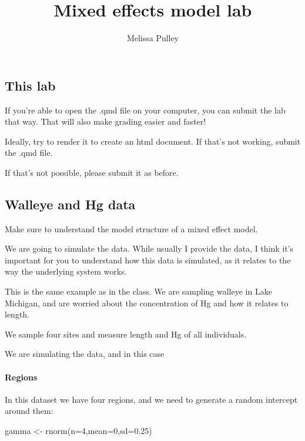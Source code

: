 \documentclass[
  letterpaper,
  DIV=11,
  numbers=noendperiod]{scrartcl}
\title{Mixed effects model lab}
\author{Melissa Pulley}
\date{}
\let\oldparagraph\paragraph
\renewcommand{\paragraph}[1]{\oldparagraph{#1}\mbox{}}
\newenvironment{Shaded}{\begin{snugshade}}{\end{snugshade}}
\newcommand{\AttributeTok}[1]{\textcolor[rgb]{0.40,0.45,0.13}{#1}}
\newcommand{\DecValTok}[1]{\textcolor[rgb]{0.68,0.00,0.00}{#1}}
\newcommand{\FloatTok}[1]{\textcolor[rgb]{0.68,0.00,0.00}{#1}}
\newcommand{\FunctionTok}[1]{\textcolor[rgb]{0.28,0.35,0.67}{#1}}
\newcommand{\NormalTok}[1]{\textcolor[rgb]{0.00,0.23,0.31}{#1}}
\newcommand{\OtherTok}[1]{\textcolor[rgb]{0.00,0.23,0.31}{#1}}
\begin{document}
\maketitle

\subsection{This lab}\label{this-lab}

If you're able to open the .qmd file on your computer, you can submit
the lab that way. That will also make grading easier and faster!

Ideally, try to render it to create an html document. If that's not
working, submit the .qmd file.

If that's not possible, please submit it as before.

\subsection{Walleye and Hg data}\label{walleye-and-hg-data}

Make sure to understand the model structure of a mixed effect model.

We are going to simulate the data. While usually I provide the data, I
think it's important for you to understand how this data is simulated,
as it relates to the way the underlying system works.

This is the same example as in the class. We are sampling walleye in
Lake Michigan, and are worried about the concentration of Hg and how it
relates to length.

We sample four sites and measure length and Hg of all individuals.

We are simulating the data, and in this case

\paragraph{Regions}\label{regions}

In this dataset we have four regions, and we need to generate a random
intercept around them:

\begin{Shaded}
\begin{Highlighting}[]
\NormalTok{gamma }\OtherTok{\textless{}{-}} \FunctionTok{rnorm}\NormalTok{(}\AttributeTok{n=}\DecValTok{4}\NormalTok{,}\AttributeTok{mean=}\DecValTok{0}\NormalTok{,}\AttributeTok{sd=}\FloatTok{0.25}\NormalTok{) }
\end{Highlighting}
\end{Shaded}
\end{document}
